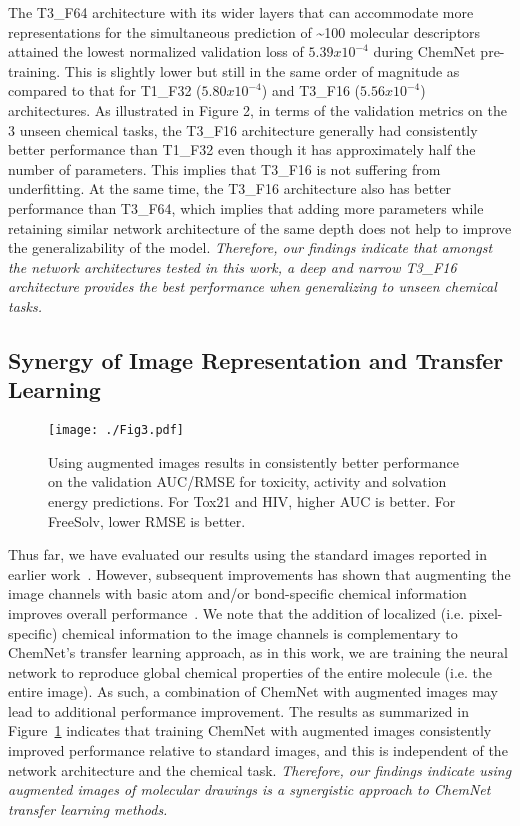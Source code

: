\documentclass[sigconf]{acmart}
\begin{document}
The T3\_F64 architecture with its wider layers that can accommodate more representations for the simultaneous prediction of \textasciitilde100 molecular descriptors attained the lowest normalized validation loss of $5.39 x 10^{-4}$ during ChemNet pre-training. This is slightly lower but still in the same order of magnitude as compared to that for T1\_F32 ($5.80 x 10^{-4}$) and T3\_F16 ($5.56 x 10^{-4}$) architectures. As illustrated in Figure 2, in terms of the validation metrics on the 3 unseen chemical tasks, the T3\_F16 architecture generally had consistently better performance than T1\_F32 even though it has approximately half the number of parameters. This implies that T3\_F16 is not suffering from underfitting. At the same time, the T3\_F16 architecture also has better performance than T3\_F64, which implies that adding more parameters while retaining similar network architecture of the same depth does not help to improve the generalizability of the model. \textit{Therefore, our findings indicate that amongst the network architectures tested in this work, a deep and narrow T3\_F16 architecture provides the best performance when generalizing to unseen chemical tasks.}

\subsection{Synergy of Image Representation and Transfer Learning}
\begin{figure}[!htbp]
\centering
\texttt{[image: ./Fig3.pdf]}
\caption{\small Using augmented images results in consistently better performance on the validation AUC/RMSE for toxicity, activity and solvation energy predictions. For Tox21 and HIV, higher AUC is better. For FreeSolv, lower RMSE is better.}
\label{fig:3}
\end{figure}

Thus far, we have evaluated our results using the standard images reported in earlier work~\cite{goh2017c1}. However, subsequent improvements has shown that augmenting the image channels with basic atom and/or bond-specific chemical information improves overall performance~\cite{goh2017c2}. We note that the addition of localized (i.e. pixel-specific) chemical information to the image channels is complementary to ChemNet's transfer learning approach, as in this work, we are training the neural network to reproduce global chemical properties of the entire molecule (i.e. the entire image). As such, a combination of ChemNet with augmented images may lead to additional performance improvement. The results as summarized in Figure~\ref{fig:3} indicates that training ChemNet with augmented images consistently improved performance relative to standard images, and this is independent of the network architecture and the chemical task. \textit{Therefore, our findings indicate using augmented images of molecular drawings is a synergistic approach to ChemNet transfer learning methods.}
\end{document}
